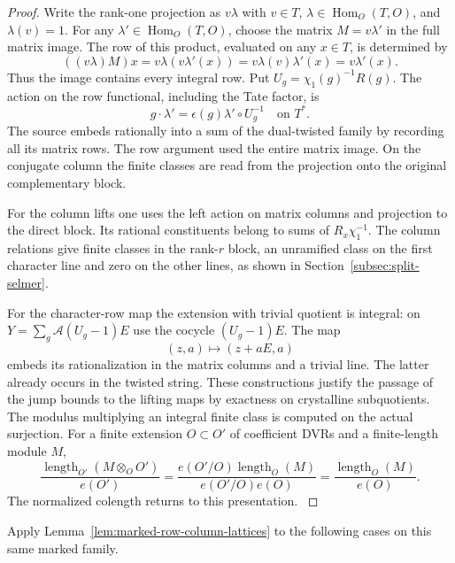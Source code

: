 \begin{proof}
Write the rank-one projection as \(v\lambda\) with
\(v\in T\), \(\lambda\in\operatorname{Hom}_O(T,O)\), and
\(\lambda(v)=1\). For any \(\lambda'\in\operatorname{Hom}_O(T,O)\),
choose the matrix \(M=v\lambda'\) in the full matrix image.
The row of this product, evaluated on any \(x\in T\), is determined by
\[
 ((v\lambda)M)x=v\lambda\!\left(v\lambda'(x)\right)
                =v\lambda(v)\lambda'(x)=v\lambda'(x).
\]
Thus the image contains every integral row.
Put \(U_g=\chi_1(g)^{-1}R(g)\). The action on the row functional, including the Tate factor, is
\[
 g\cdot\lambda'=\epsilon(g)\lambda'\circ U_g^{-1}\quad\text{on }T^*.
\]
The source embeds rationally into a sum
of the dual-twisted family by recording all its matrix rows.
The row argument used the entire matrix image. On the conjugate column the finite classes are read from the projection onto the original complementary block.

For the column lifts one uses the left action on matrix
columns and projection to the direct block. Its rational
constituents belong to sums of \(R_x\chi_1^{-1}\).
The column relations give finite classes in the rank-\(r\)
block, an unramified class on the first character line and
zero on the other lines, as shown in
Section~\ref{subsec:split-selmer}.

For the character-row map
the extension with trivial quotient is integral: on
\(Y=\sum_g\mathcal A(U_g-1)E\) use the cocycle \((U_g-1)E\).
The map
\[
 (z,a)\mapsto(z+aE,a)
\]
embeds its rationalization
in the matrix columns and a trivial line. The latter already
occurs in the twisted string. These constructions justify the
passage of the jump bounds to the lifting maps by exactness
on crystalline subquotients. The modulus multiplying an
integral finite class is computed on the actual surjection.
For a finite extension \(O\subset O'\) of coefficient DVRs and a finite-length module \(M\),
\[
 \frac{\operatorname{length}_{O'}(M\otimes_O O')}{e(O')}=\frac{e(O'/O)\operatorname{length}_O(M)}{e(O'/O)e(O)}=\frac{\operatorname{length}_O(M)}{e(O)}.
\]
The normalized colength
returns to this presentation. \label{cor:marked-localization-7}
\end{proof}

Apply Lemma~\ref{lem:marked-row-column-lattices} to the
following cases on this same marked family.

